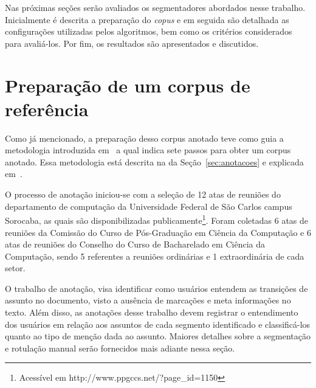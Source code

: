Nas próximas seções serão avaliados os segmentadores abordados nesse trabalho. Inicialmente é descrita a preparação do \textit{copus} e em seguida são detalhada as configurações utilizadas pelos algoritmos, bem como os critérios considerados para avaliá-los. Por fim, os resultados são apresentados e discutidos.


\section{Preparação de um corpus de referência}




Como já mencionado, a preparação desso corpus anotado teve como guia a metodologia introduzida em~\cite{Hovy2010} a qual indica sete passos para obter um corpus anotado. Essa metodologia está descrita na da Seção~\ref{sec:anotacoes} e explicada em~\cite{Cardoso2017}. 



O processo de anotação iniciou-se com a seleção de 12 atas de reuniões do departamento de computação da Universidade Federal de São Carlos campus Sorocaba, as quais são disponibilizadas publicamente\footnote{Acessível em  http://www.ppgccs.net/?page_id=1150}. Foram coletadas 6 atas de reuniões da Comissão do Curso de Pós-Graduação em Ciência da Computação e 6 atas de reuniões do Conselho do Curso de Bacharelado em Ciência da Computação, sendo 5 referentes a reuniões ordinárias e 1 extraordinária de cada setor.

O trabalho de anotação, visa identificar como usuários entendem as transições de assunto no documento, visto a ausência de marcações e meta informações no texto. Além disso, as anotações desse trabalho devem registrar o entendimento dos usuários em relação aos assuntos de cada segmento identificado e classificá-los quanto ao tipo de menção dada ao assunto. Maiores detalhes sobre a segmentação e rotulação manual serão fornecidos mais adiante nessa seção.



